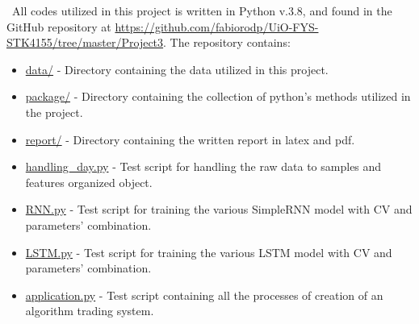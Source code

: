 \quad \, All codes utilized in this project is written in Python v.3.8, and found in the GitHub repository at \href{https://github.com/fabiorodp/UiO-FYS-STK4155/tree/master/Project3}{https://github.com/fabiorodp/UiO-FYS-STK4155/tree/master/Project3}. The repository contains:

\begin{itemize}
\item \href{https://github.com/fabiorodp/UiO-FYS-STK4155/tree/master/Project3/data/}{data/} - Directory containing the data utilized in this project.
\item \href{https://github.com/fabiorodp/UiO-FYS-STK4155/tree/master/Project3/package/}{package/} - Directory containing the collection of python's methods utilized in the project.
\item \href{https://github.com/fabiorodp/UiO-FYS-STK4155/tree/master/Project3/report/}{report/} - Directory containing the written report in latex and pdf.
\item \href{https://github.com/fabiorodp/UiO-FYS-STK4155/tree/master/Project3/handling_data.py}{handling\_day.py} - Test script for handling the raw data to samples and features organized object.
\item \href{https://github.com/fabiorodp/UiO-FYS-STK4155/tree/master/Project3/RNN.py}{RNN.py} - Test script for training the various SimpleRNN model with CV and parameters' combination.
\item \href{https://github.com/fabiorodp/UiO-FYS-STK4155/tree/master/Project3/LSTM.py}{LSTM.py} - Test script for training the various LSTM model with CV and parameters' combination.
\item \href{https://github.com/fabiorodp/UiO-FYS-STK4155/tree/master/Project3/application.py}{application.py} - Test script containing all the processes of creation of an algorithm trading system.
\end{itemize}
